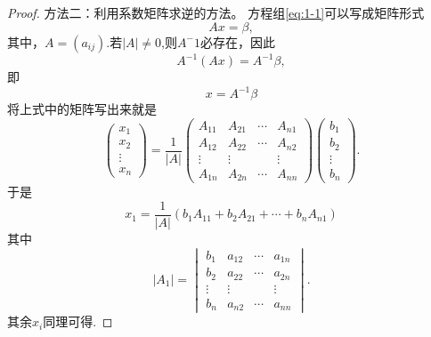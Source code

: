 \begin{proof}
  方法二：利用系数矩阵求逆的方法。
  方程组\eqref{eq:1-1}可以写成矩阵形式
  \begin{equation*}
    Ax=\beta,
  \end{equation*}
  其中，$A=(a_{ij})$.若$|A| \neq 0$,则$A^-1$必存在，因此
  \begin{equation*}
    A^{-1}(Ax)=A^{-1}\beta, 
  \end{equation*}
  即
  \begin{equation*}
    x=A^{-1}\beta
  \end{equation*}
  将上式中的矩阵写出来就是
  \begin{equation*}
    \begin{pmatrix}
      x_1\\
      x_2\\
      \vdots\\
      x_n
    \end{pmatrix}=\frac{1}{|A|}
    \begin{pmatrix}
      A_{11} & A_{21} & \cdots & A_{n1}\\
      A_{12} & A_{22} & \cdots & A_{n2}\\
      \vdots & \vdots & & \vdots\\
      A_{1n} & A_{2n} & \cdots & A_{nn}
    \end{pmatrix}
    \begin{pmatrix}
      b_1\\
      b_2\\
      \vdots\\
      b_n
    \end{pmatrix}.
  \end{equation*}
  于是
  \begin{equation*}
    x_1=\frac{1}{|A|}(b_1A_{11}+b_2A_{21}+\cdots+b_nA_{n1})
  \end{equation*}
其中
\begin{equation*}
  |A_1|=
  \begin{vmatrix}
    b_1 & a_{12} & \cdots & a_{1n}\\
    b_2 & a_{22} & \cdots & a_{2n}\\
    \vdots & \vdots & & \vdots\\
    b_n & a_{n2} & \cdots & a_{nn}
  \end{vmatrix}.
\end{equation*}
其余$x_i$同理可得.
\end{proof}

